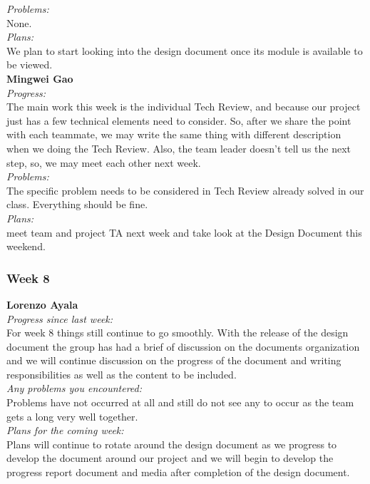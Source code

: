 \noindent\textit{Problems:}\\
\noindent None.\\

\noindent\textit{Plans:}\\
\noindent We plan to start looking into the design document once its module is available to be viewed.\\

\noindent\textbf{Mingwei Gao}\\
\noindent\textit{Progress:}\\
The main work this week is the individual Tech Review, and because our project just has a few technical elements need to consider. So, after we share the point with each teammate, we may write the same thing with different description when we doing the Tech Review. Also, the team leader doesn't tell us the next step, so, we may meet each other next week.\\

\noindent\textit{Problems:}\\
\noindent The specific problem needs to be considered in Tech Review already solved in our class. Everything should be fine.\\

\noindent\textit{Plans:}\\
\noindent meet team and project TA next week and take look at the Design Document this weekend.\\

\subsubsection{Week 8}

\textbf{Lorenzo Ayala}\\
\noindent\textit{Progress since last week:}\\
For week 8 things still continue to go smoothly. With the release of the design document the group has had a brief of discussion on the documents organization and we will continue discussion on the progress of the document and writing responsibilities as well as the content to be included.\\

\noindent\textit{Any problems you encountered:}\\
\noindent Problems have not occurred at all and still do not see any to occur as the team gets a long very well together.\\

\noindent\textit{Plans for the coming week:}\\
\noindent Plans will continue to rotate around the design document as we progress to develop the document around our project and we will begin to develop the progress report document and media after completion of the design document.\\

